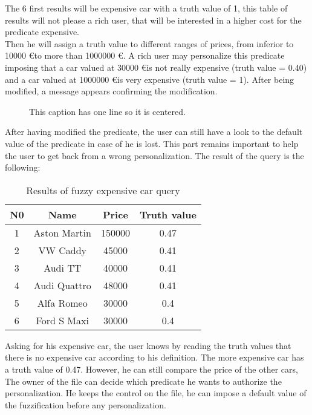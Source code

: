 \documentclass[a4paper,twoside]{article}
\begin{document}
\noindent The 6 first results will be expensive car with a truth value of 1, this table of results will not please a rich user, that will be interested in a higher cost for the predicate expensive. \\

\noindent Then he will assign a truth value to different ranges of prices, from inferior to 10000 \euro to more than 1000000 \euro. A rich user may personalize this predicate imposing that a car valued at 30000 \euro is not really expensive (truth value = 0.40) and a car valued at 1000000 \euro is very expensive (truth value = 1). After being modified, a message appears confirming the modification. \\

\begin{figure}[!h]
  \centering
   {}
  \caption{This caption has one line so it is centered.}
  \label{fig:example1}
 \end{figure}

\noindent After having modified the predicate, the user can still have a look to the default value of the predicate in case of he is lost. This part remains important to help the user to get back from a wrong personalization. The result of the query is the following:  \\ 

\begin{table}[h]
\caption{Results of fuzzy expensive car query}\label{tab:solveQuery1} \centering
\begin{tabular}{|c|c|c|c|}
  \hline
  N0 & Name & Price & Truth value\\
  \hline
  1 & Aston Martin & 150000 & 0.47 \\
  \hline
  2 & VW Caddy & 45000 & 0.41\\
  \hline
  3 & Audi TT & 40000 & 0.41 \\
  \hline
  4 & Audi Quattro & 48000 & 0.41 \\ 
  \hline
  5 & Alfa Romeo & 30000 & 0.4 \\
  \hline
  6 & Ford S Maxi & 30000 & 0.4 \\
  \hline
\end{tabular}
\end{table}

\noindent Asking for his expensive car, the user knows by reading the truth values that there is no expensive car according to his definition. The more expensive car has a truth value of 0.47. However, he can still compare the price of the other cars,
The owner of the file can decide which predicate he wants to authorize the personalization. He keeps the control on the file, he can impose a default value of the fuzzification before any personalization. \\
\end{document}
